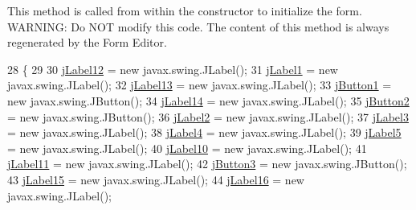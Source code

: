 This method is called from within the constructor to initialize the form. W\+A\+R\+N\+I\+NG\+: Do N\+OT modify this code. The content of this method is always regenerated by the Form Editor. 
\begin{DoxyCode}
28                                   \{
29 
30         \mbox{\hyperlink{classsoftware_1_1validornotvalid_a5a7bbbddab22b0193c6b6776c7aa5f6b}{jLabel12}} = \textcolor{keyword}{new} javax.swing.JLabel();
31         \mbox{\hyperlink{classsoftware_1_1validornotvalid_ad6cb9e904f7cb7d49c96c66285d81f2f}{jLabel1}} = \textcolor{keyword}{new} javax.swing.JLabel();
32         \mbox{\hyperlink{classsoftware_1_1validornotvalid_abaafc4b5c74ef3845c0469f1bf1ae5eb}{jLabel13}} = \textcolor{keyword}{new} javax.swing.JLabel();
33         \mbox{\hyperlink{classsoftware_1_1validornotvalid_a4322ace1270f409aa8ada36dd8fde2e5}{jButton1}} = \textcolor{keyword}{new} javax.swing.JButton();
34         \mbox{\hyperlink{classsoftware_1_1validornotvalid_a898329c2e85620214a3e83a8ec229895}{jLabel14}} = \textcolor{keyword}{new} javax.swing.JLabel();
35         \mbox{\hyperlink{classsoftware_1_1validornotvalid_a18b41fd0e21eac702ca4a03b9a10285b}{jButton2}} = \textcolor{keyword}{new} javax.swing.JButton();
36         \mbox{\hyperlink{classsoftware_1_1validornotvalid_a896d5beda5159ad343db01b03383b0f5}{jLabel2}} = \textcolor{keyword}{new} javax.swing.JLabel();
37         \mbox{\hyperlink{classsoftware_1_1validornotvalid_a7b2e42b02447e6b29b0c4626ee773c0d}{jLabel3}} = \textcolor{keyword}{new} javax.swing.JLabel();
38         \mbox{\hyperlink{classsoftware_1_1validornotvalid_a8e62567b7da0a8b4c83016569d52963e}{jLabel4}} = \textcolor{keyword}{new} javax.swing.JLabel();
39         \mbox{\hyperlink{classsoftware_1_1validornotvalid_a4759a0841dcab0fa20a6e40de41546d0}{jLabel5}} = \textcolor{keyword}{new} javax.swing.JLabel();
40         \mbox{\hyperlink{classsoftware_1_1validornotvalid_a2255215afcbe0670ccbeec10ca5c7aca}{jLabel10}} = \textcolor{keyword}{new} javax.swing.JLabel();
41         \mbox{\hyperlink{classsoftware_1_1validornotvalid_aa639ffbcb05919b5b8be27b096c874da}{jLabel11}} = \textcolor{keyword}{new} javax.swing.JLabel();
42         \mbox{\hyperlink{classsoftware_1_1validornotvalid_ab48fb28356cce2216dcac1cb0131624c}{jButton3}} = \textcolor{keyword}{new} javax.swing.JButton();
43         \mbox{\hyperlink{classsoftware_1_1validornotvalid_aa1a81f594817fe87cc5fbbd85d33aa8a}{jLabel15}} = \textcolor{keyword}{new} javax.swing.JLabel();
44         \mbox{\hyperlink{classsoftware_1_1validornotvalid_a071acd2388aa23129a2da2e239c494d8}{jLabel16}} = \textcolor{keyword}{new} javax.swing.JLabel();

\end{DoxyCode}
